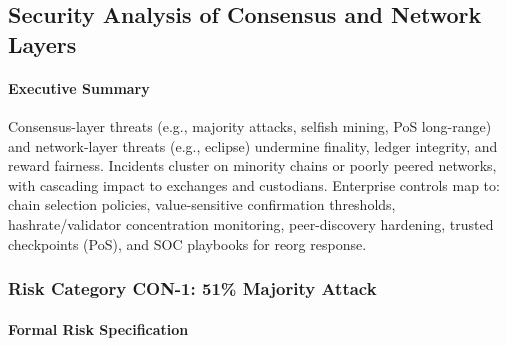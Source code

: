 \subsection{Security Analysis of Consensus and Network Layers}
\label{sec:results_consensus_network}

\paragraph{Executive Summary}
Consensus-layer threats (e.g., majority attacks, selfish mining, PoS long-range) and network-layer threats (e.g., eclipse) undermine finality, ledger integrity, and reward fairness. Incidents cluster on minority chains or poorly peered networks, with cascading impact to exchanges and custodians. Enterprise controls map to: chain selection policies, value-sensitive confirmation thresholds, hashrate/validator concentration monitoring, peer-discovery hardening, trusted checkpoints (PoS), and SOC playbooks for reorg response.

\subsubsection{Risk Category CON-1: 51\% Majority Attack}

\paragraph{Formal Risk Specification}

